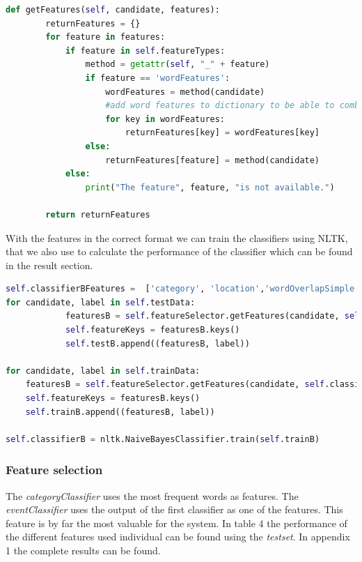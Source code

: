 \documentclass[
10pt, %
a4paper, %
oneside, %
headinclude,footinclude, %
BCOR5mm, %
]{scrartcl}
\begin{document}
\begin{lstlisting}[language=Python, caption=Selecting features]
def getFeatures(self, candidate, features):
        returnFeatures = {}
        for feature in features:
            if feature in self.featureTypes:
                method = getattr(self, "_" + feature)
                if feature == 'wordFeatures':
                    wordFeatures = method(candidate)
                    #add word features to dictionary to be able to combine features
                    for key in wordFeatures:
                        returnFeatures[key] = wordFeatures[key]
                else:
                    returnFeatures[feature] = method(candidate)
            else:
                print("The feature", feature, "is not available.")

        return returnFeatures
\end{lstlisting}

\noindent With the features in the correct format we can train the classifiers using NLTK, that we also use to calculate the performance of the classifier which can be found in the result section. 
\vl
\begin{lstlisting}[language=Python, caption=Selecting features]
self.classifierBFeatures =  ['category', 'location','wordOverlapSimple','wordOverlapUser']
for candidate, label in self.testData:
            featuresB = self.featureSelector.getFeatures(candidate, self.classifierBFeatures)   
            self.featureKeys = featuresB.keys()
            self.testB.append((featuresB, label)) 
            
for candidate, label in self.trainData:
    featuresB = self.featureSelector.getFeatures(candidate, self.classifierBFeatures)
    self.featureKeys = featuresB.keys()
    self.trainB.append((featuresB, label))

self.classifierB = nltk.NaiveBayesClassifier.train(self.trainB)
\end{lstlisting}




\subsubsection{Feature selection}
The \textit{categoryClassifier} uses the most frequent words as features. The \textit{eventClassifier} uses the output of the first classifier as one of the features. This feature is by far the most valuable for the system. In table 4 the performance of the different features used individual can be found using the \textit{testset}. In appendix 1 the complete results can be found.
\end{document}
